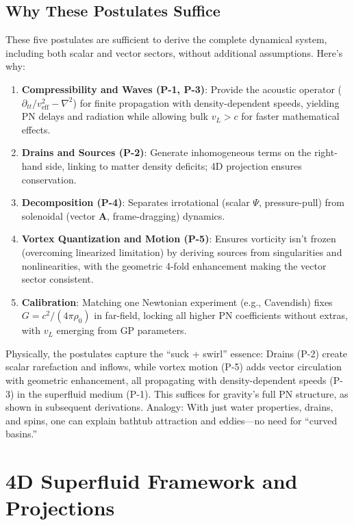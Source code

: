 \documentclass{article}
\begin{document}
\subsection{Why These Postulates Suffice}

These five postulates are sufficient to derive the complete dynamical system, including both scalar and vector sectors, without additional assumptions. Here's why:

\begin{enumerate}
    \item \textbf{Compressibility and Waves (P-1, P-3)}: Provide the acoustic operator ($\partial_{tt}/v_{\text{eff}}^2 - \nabla^2$) for finite propagation with density-dependent speeds, yielding PN delays and radiation while allowing bulk $v_L > c$ for faster mathematical effects.
    \item \textbf{Drains and Sources (P-2)}: Generate inhomogeneous terms on the right-hand side, linking to matter density deficits; 4D projection ensures conservation.
    \item \textbf{Decomposition (P-4)}: Separates irrotational (scalar $\Psi$, pressure-pull) from solenoidal (vector $\mathbf{A}$, frame-dragging) dynamics.
    \item \textbf{Vortex Quantization and Motion (P-5)}: Ensures vorticity isn't frozen (overcoming linearized limitation) by deriving sources from singularities and nonlinearities, with the geometric 4-fold enhancement making the vector sector consistent.
    \item \textbf{Calibration}: Matching one Newtonian experiment (e.g., Cavendish) fixes $G = c^2 / (4\pi \rho_0)$ in far-field, locking all higher PN coefficients without extras, with $v_L$ emerging from GP parameters.
\end{enumerate}

Physically, the postulates capture the ``suck + swirl'' essence: Drains (P-2) create scalar rarefaction and inflows, while vortex motion (P-5) adds vector circulation with geometric enhancement, all propagating with density-dependent speeds (P-3) in the superfluid medium (P-1). This suffices for gravity's full PN structure, as shown in subsequent derivations. Analogy: With just water properties, drains, and spins, one can explain bathtub attraction and eddies---no need for ``curved basins.''

\section{4D Superfluid Framework and Projections}
\end{document}
